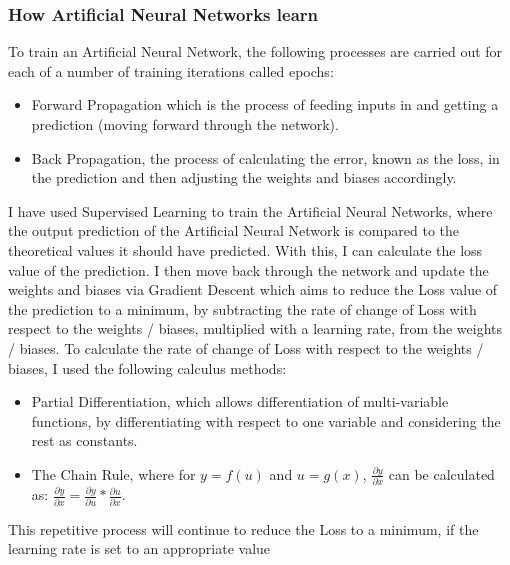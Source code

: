 \documentclass[./project-report/src/latex/project-report.tex]{subfiles}
\begin{document}
\vspace{5mm}

\subsubsection{How Artificial Neural Networks learn}
\vspace{5mm}

To train an Artificial Neural Network, the following processes are carried out for each of a number of training iterations called epochs:

\begin{itemize}
    \item Forward Propagation which is the process of feeding inputs in and getting a prediction (moving forward through the network).
    \item Back Propagation, the process of calculating the error, known as the loss, in the prediction and then adjusting the weights and biases accordingly.
\end{itemize}

I have used Supervised Learning to train the Artificial Neural Networks, where the output prediction of the Artificial Neural Network is compared to the theoretical values it should have 
predicted. With this, I can calculate the loss value of the prediction. I then move back through the network and update the weights and biases via Gradient Descent which aims to reduce 
the Loss value of the prediction to a minimum, by subtracting the rate of change of Loss with respect to the weights / biases, multiplied with a learning rate, from the weights / biases. 
To calculate the rate of change of Loss with respect to the weights / biases, I used the following calculus methods:

\begin{itemize}
    \item Partial Differentiation, which allows differentiation of multi-variable functions, by differentiating with respect to one variable and considering the rest as 
		  constants.
    \item The Chain Rule, where for $y = f(u)$ and $u = g(x)$, $\frac{\partial{y}}{\partial{x}}$ can be calculated as: $\frac{\partial{y}}{\partial{x}} = \frac{\partial{y}}{\partial{u}} * \frac{\partial{u}}{\partial{x}}$.
\end{itemize}

This repetitive process will continue to reduce the Loss to a minimum, if the learning rate is set to an appropriate value
\end{document}
